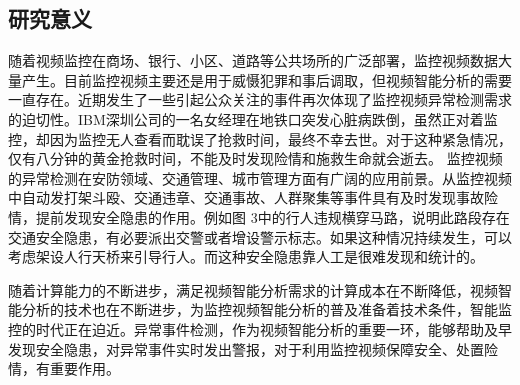 \begin{mdframed}[everyline=true]
\subsection{研究意义}
    随着视频监控在商场、银行、小区、道路等公共场所的广泛部署，监控视频数据大量产生。目前监控视频主要还是用于威慑犯罪和事后调取，但视频智能分析的需要一直存在。近期发生了一些引起公众关注的事件再次体现了监控视频异常检测需求的迫切性。IBM深圳公司的一名女经理在地铁口突发心脏病跌倒，虽然正对着监控，却因为监控无人查看而耽误了抢救时间，最终不幸去世。对于这种紧急情况，仅有八分钟的黄金抢救时间，不能及时发现险情和施救生命就会逝去。
    监控视频的异常检测在安防领域、交通管理、城市管理方面有广阔的应用前景。从监控视频中自动发打架斗殴、交通违章、交通事故、人群聚集等事件具有及时发现事故险情，提前发现安全隐患的作用。例如图 3中的行人违规横穿马路，说明此路段存在交通安全隐患，有必要派出交警或者增设警示标志。如果这种情况持续发生，可以考虑架设人行天桥来引导行人。而这种安全隐患靠人工是很难发现和统计的。

  随着计算能力的不断进步，满足视频智能分析需求的计算成本在不断降低，视频智能分析的技术也在不断进步，为监控视频智能分析的普及准备着技术条件，智能监控的时代正在迫近。异常事件检测，作为视频智能分析的重要一环，能够帮助及早发现安全隐患，对异常事件实时发出警报，对于利用监控视频保障安全、处置险情，有重要作用。 
\\[8 cm]
\end{mdframed}

